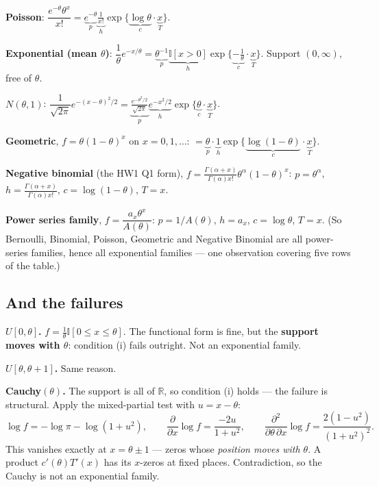 \documentclass[11pt]{article}
\newcommand{\R}{\mathbb{R}}
\newcommand{\I}{\mathbb{I}}
\begin{document}
\smallskip
\textbf{Poisson}: $\dfrac{e^{-\theta}\theta^{x}}{x!}
=\underbrace{e^{-\theta}}_{p}\underbrace{\tfrac{1}{x!}}_{h}
\exp\{\underbrace{\log\theta}_{c}\cdot\underbrace{x}_{T}\}$.

\smallskip
\textbf{Exponential (mean $\theta$)}: $\dfrac1\theta e^{-x/\theta}
=\underbrace{\theta^{-1}}_{p}\underbrace{\I[x>0]}_{h}\exp\{\underbrace{-\tfrac1\theta}_{c}\cdot
\underbrace{x}_{T}\}$. Support $(0,\infty)$, free of $\theta$. \checkmark

\smallskip
\textbf{$N(\theta,1)$}: $\dfrac{1}{\sqrt{2\pi}}e^{-(x-\theta)^2/2}
=\underbrace{\tfrac{e^{-\theta^2/2}}{\sqrt{2\pi}}}_{p}\underbrace{e^{-x^2/2}}_{h}
\exp\{\underbrace{\theta}_{c}\cdot\underbrace{x}_{T}\}$.

\smallskip
\textbf{Geometric}, $f=\theta(1-\theta)^x$ on $x=0,1,\dots$:
$=\underbrace{\theta}_{p}\cdot\underbrace{1}_{h}\exp\{\underbrace{\log(1-\theta)}_{c}\cdot
\underbrace{x}_{T}\}$.

\smallskip
\textbf{Negative binomial} (the HW1 Q1 form),
$f=\tfrac{\Gamma(\alpha+x)}{\Gamma(\alpha)x!}\theta^{\alpha}(1-\theta)^{x}$:
$p=\theta^{\alpha}$, $h=\tfrac{\Gamma(\alpha+x)}{\Gamma(\alpha)x!}$, $c=\log(1-\theta)$, $T=x$.

\smallskip
\textbf{Power series family}, $f=\dfrac{a_x\theta^{x}}{A(\theta)}$:
$p=1/A(\theta)$, $h=a_x$, $c=\log\theta$, $T=x$. (So Bernoulli, Binomial, Poisson, Geometric
and Negative Binomial are all power-series families, hence all exponential families --- one
observation covering five rows of the table.)

\subsection{And the failures}

\textbf{$U[0,\theta]$.} $f=\tfrac1\theta\I[0\le x\le\theta]$. The functional form is fine, but
the \textbf{support moves with $\theta$}: condition (i) fails outright. Not an exponential
family.

\smallskip
\textbf{$U[\theta,\theta+1]$.} Same reason.

\smallskip
\textbf{Cauchy$(\theta)$.} The support is all of $\R$, so condition (i) holds --- the failure
is structural. Apply the mixed-partial test with $u=x-\theta$:
\[
\log f=-\log\pi-\log(1+u^{2}),\qquad
\frac{\partial}{\partial x}\log f=\frac{-2u}{1+u^{2}},\qquad
\frac{\partial^{2}}{\partial\theta\,\partial x}\log f=\frac{2(1-u^{2})}{(1+u^{2})^{2}} .
\]
This vanishes exactly at $x=\theta\pm1$ --- zeros whose \emph{position moves with $\theta$}.
A product $c'(\theta)T'(x)$ has its $x$-zeros at fixed places. Contradiction, so the Cauchy is
not an exponential family.
\end{document}
